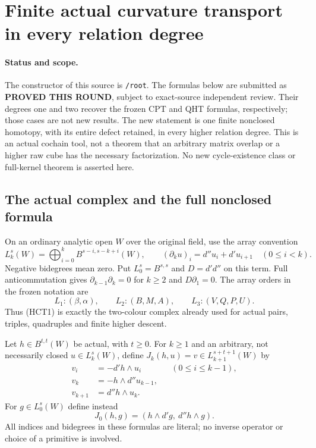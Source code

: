 \section{Finite actual curvature transport in every relation degree}
\label{sec:r12-higher-actual-transport}

\paragraph{Status and scope.}
The constructor of this source is \texttt{/root}.  The formulas below
are submitted as \textbf{PROVED THIS ROUND}, subject to exact-source
independent review.  Their degrees one and two recover the frozen CPT
and QHT formulas, respectively; those cases are not new results.
The new statement is one finite nonclosed homotopy, with its entire
defect retained, in every higher relation degree.  This is an actual
cochain tool, not a theorem that an arbitrary matrix overlap or a
higher raw cube has the necessary factorization.  No new cycle-existence
class or full-kernel theorem is asserted here.

\subsection{The actual complex and the full nonclosed formula}

On an ordinary analytic open $W$ over the original field, use the
array convention
\[
 L_k^s(W)=\bigoplus_{i=0}^k B^{s-i,s-k+i}(W),\qquad
 (\partial_k u)_i=d''u_i+d'u_{i+1}\quad(0\le i<k).
 \tag{HCT1}
\]
Negative bidegrees mean zero.  Put $L_0^s=B^{s,s}$ and
$D=d'd''$ on this term.  Full anticommutation gives
$\partial_{k-1}\partial_k=0$ for $k\ge2$ and $D\partial_1=0$.
The array orders in the frozen notation are
\[
 L_1:(\beta,\alpha),\qquad L_2:(B,M,A),\qquad
 L_3:(V,Q,P,U).
 \tag{HCT2}
\]
Thus (HCT1) is exactly the two-colour complex already used for
actual pairs, triples, quadruples and finite higher descent.

Let $h\in B^{t,t}(W)$ be actual, with $t\ge0$.  For $k\ge1$
and an arbitrary, not necessarily closed $u\in L_k^s(W)$, define
$J_k(h,u)=v\in L_{k+1}^{s+t+1}(W)$ by
\[
 \begin{split}
 v_i&=-d'h\wedge u_i &&(0\le i\le k-1),\\
 v_k&=-h\wedge d''u_{k-1},\\
 v_{k+1}&=d''h\wedge u_k.
 \end{split}
 \tag{HCT3}
\]
For $g\in L_0^s(W)$ define instead
\[
                 J_0(h,g)=(h\wedge d'g,\ d''h\wedge g).
 \tag{HCT4}
\]
All indices and bidegrees in these formulas are literal; no inverse
operator or choice of a primitive is involved.

